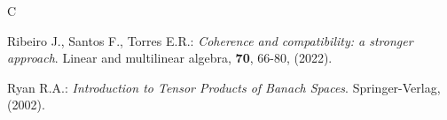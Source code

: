 \documentclass[12 pt]{article}%
\newtheorem{final remark}[theorem]{Final Remark}
\begin{document}
\begin{thebibliography}{C}
	
	
	
	
	 Ribeiro J., Santos F., Torres E.R.: {\it Coherence and compatibility: a stronger approach}.
	Linear and multilinear algebra, {\bf 70}, 66-80, (2022).
	
	 Ryan R.A.: {\it Introduction to Tensor Products of Banach Spaces}. Springer-Verlag, (2002).
	
	
	
	
	
	
	
	
	
	
	
	
	
	
	
\end{thebibliography}
\end{document}
